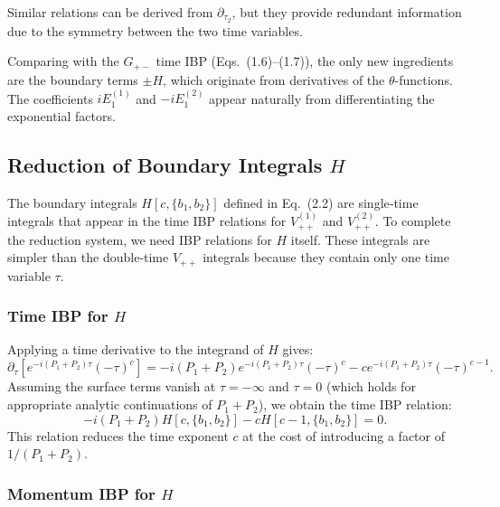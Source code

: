 \documentclass[a4paper,12pt]{article}
\begin{document}
Similar relations can be derived from $\partial_{\tau_2}$, but they provide redundant information due to the symmetry between the two time variables.

Comparing with the $G_{+-}$ time IBP (Eqs.~(1.6)--(1.7)), the only new ingredients are the boundary terms $\pm H$, which originate from derivatives of the $\theta$-functions. The coefficients $iE_1^{(1)}$ and $-iE_1^{(2)}$ appear naturally from differentiating the exponential factors.
\subsection{Reduction of Boundary Integrals $H$}

The boundary integrals $H[c,\{b_1,b_2\}]$ defined in Eq.~(2.2) are single‑time integrals that appear in the time IBP relations for $V_{++}^{(1)}$ and $V_{++}^{(2)}$. To complete the reduction system, we need IBP relations for $H$ itself. These integrals are simpler than the double‑time $V_{++}$ integrals because they contain only one time variable $\tau$.

\subsubsection{Time IBP for $H$}

Applying a time derivative to the integrand of $H$ gives:
\begin{equation}
	\partial_\tau \left[ e^{-i(P_1+P_2)\tau} (-\tau)^c \right] = -i(P_1+P_2) e^{-i(P_1+P_2)\tau} (-\tau)^c - c e^{-i(P_1+P_2)\tau} (-\tau)^{c-1}.
\end{equation}
Assuming the surface terms vanish at $\tau=-\infty$ and $\tau=0$ (which holds for appropriate analytic continuations of $P_1+P_2$), we obtain the time IBP relation:
\begin{equation}
	-i(P_1+P_2) H[c,\{b_1,b_2\}] - c H[c-1,\{b_1,b_2\}] = 0. \label{eq:HtimeIBP}
\end{equation}
This relation reduces the time exponent $c$ at the cost of introducing a factor of $1/(P_1+P_2)$.

\subsubsection{Momentum IBP for $H$}
\end{document}
